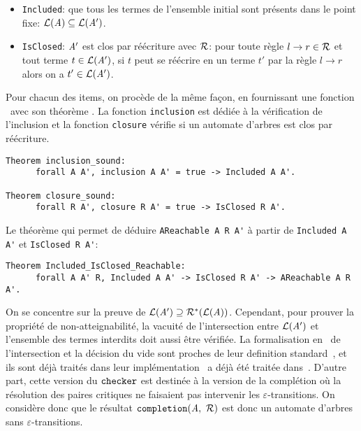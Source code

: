 \begin{itemize}
\item \lstinline!Included!: que tous les termes de l'ensemble initial sont présents  dans le point fixe: $\mathcal{L}(\mathit A) \subseteq \mathcal{L}(\mathit A')$.

\item \lstinline!IsClosed!: $\mathit A'$ est clos par réécriture avec $\mathcal R$: pour toute règle $l \rightarrow
  r \in \mathcal R$ et tout terme $t \in \mathcal{L}(\mathit A')$, si $t$ peut se réécrire en un terme $t'$ par la règle
  $l \rightarrow r$ alors on a $t' \in \mathcal{L}(\mathit A')$. 
\end{itemize}
Pour chacun des items, on procède de la même façon, en fournissant une fonction \coq\ avec son théorème \coq.
La fonction \texttt{inclusion} est dédiée à la vérification de l'inclusion et la fonction \texttt{closure}
vérifie si un automate d'arbres est clos par réécriture. 
\begin{lstlisting}
Theorem inclusion_sound:
      forall A A', inclusion A A' = true -> Included A A'.

Theorem closure_sound:
      forall R A', closure R A' = true -> IsClosed R A'.
\end{lstlisting}

Le théorème qui permet de déduire \lstinline!AReachable A R A'! à partir de \lstinline!Included A A'! et \lstinline!IsClosed R A'!:
\begin{lstlisting}
Theorem Included_IsClosed_Reachable:
      forall A A' R, Included A A' -> IsClosed R A' -> AReachable A R A'.
\end{lstlisting}


On se concentre sur la preuve de  $\mathcal{L}(\mathit A')\supseteq \mathcal R^*(\mathcal{L}(\mathit A))$. 
Cependant, pour prouver la propriété de non-atteignabilité, la vacuité de l'intersection
entre $\mathcal{L}(\mathit A')$ et l'ensemble des termes interdits doit aussi être vérifiée.
La formalisation en \coq\ de l'intersection et la décision du vide sont proches
de leur definition standard~\cite{TATA}, et ils sont déjà traités dans leur implémentation
\coq\ a déjà été traitée dans~\cite{RivalGL-TPHOL01}.
D'autre part, cette version du $\mathtt{checker}$ est destinée à la version de la complétion où 
la résolution des paires critiques ne faisaient pas intervenir les $\varepsilon$-transitions.
On considère donc que le résultat $\mathtt{completion}(\mathit A,\ \mathcal R)$ est donc un automate d'arbres 
sans $\varepsilon$-transitions. 

